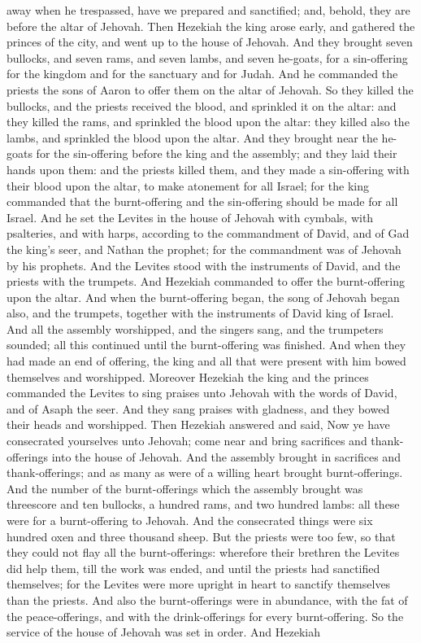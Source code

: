 away when he trespassed, have we prepared and sanctified; and, behold, they are before the altar of Jehovah.  Then Hezekiah the king arose early, and gathered the princes of the city, and went up to the house of Jehovah. And they brought seven bullocks, and seven rams, and seven lambs, and seven he-goats, for a sin-offering for the kingdom and for the sanctuary and for Judah. And he commanded the priests the sons of Aaron to offer them on the altar of Jehovah. So they killed the bullocks, and the priests received the blood, and sprinkled it on the altar: and they killed the rams, and sprinkled the blood upon the altar: they killed also the lambs, and sprinkled the blood upon the altar. And they brought near the he-goats for the sin-offering before the king and the assembly; and they laid their hands upon them: and the priests killed them, and they made a sin-offering with their blood upon the altar, to make atonement for all Israel; for the king commanded that the burnt-offering and the sin-offering should be made for all Israel.  And he set the Levites in the house of Jehovah with cymbals, with psalteries, and with harps, according to the commandment of David, and of Gad the king’s seer, and Nathan the prophet; for the commandment was of Jehovah by his prophets. And the Levites stood with the instruments of David, and the priests with the trumpets. And Hezekiah commanded to offer the burnt-offering upon the altar. And when the burnt-offering began, the song of Jehovah began also, and the trumpets, together with the instruments of David king of Israel. And all the assembly worshipped, and the singers sang, and the trumpeters sounded; all this continued until the burnt-offering was finished.  And when they had made an end of offering, the king and all that were present with him bowed themselves and worshipped. Moreover Hezekiah the king and the princes commanded the Levites to sing praises unto Jehovah with the words of David, and of Asaph the seer. And they sang praises with gladness, and they bowed their heads and worshipped.  Then Hezekiah answered and said, Now ye have consecrated yourselves unto Jehovah; come near and bring sacrifices and thank-offerings into the house of Jehovah. And the assembly brought in sacrifices and thank-offerings; and as many as were of a willing heart brought burnt-offerings. And the number of the burnt-offerings which the assembly brought was threescore and ten bullocks, a hundred rams, and two hundred lambs: all these were for a burnt-offering to Jehovah. And the consecrated things were six hundred oxen and three thousand sheep. But the priests were too few, so that they could not flay all the burnt-offerings: wherefore their brethren the Levites did help them, till the work was ended, and until the priests had sanctified themselves; for the Levites were more upright in heart to sanctify themselves than the priests. And also the burnt-offerings were in abundance, with the fat of the peace-offerings, and with the drink-offerings for every burnt-offering. So the service of the house of Jehovah was set in order. And Hezekiah 